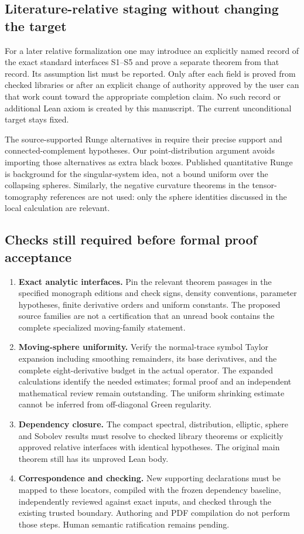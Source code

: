 \documentclass[11pt]{article}
\theoremstyle{definition}
\theoremstyle{remark}
\numberwithin{equation}{section}
\begin{document}
\subsection{Literature-relative staging without changing the target}
For a later relative formalization one may introduce an explicitly named
record of the exact standard interfaces S1--S5 and prove a separate theorem
from that record. Its assumption list must be reported. Only after each
field is proved from checked libraries or after an explicit change of
authority approved by the user can that work count toward the appropriate
completion claim. No such record or additional Lean axiom is created by
this manuscript. The current unconditional target stays fixed.

The source-supported Runge alternatives in \cite{LLS20} require their
precise support and connected-complement hypotheses. Our point-distribution
argument avoids importing those alternatives as extra black boxes.
Published quantitative Runge is background for the singular-system idea,
not a bound uniform over the collapsing spheres. Similarly, the negative
curvature theorems in the tensor-tomography references are not used:
only the sphere identities discussed in the local calculation are relevant.

\subsection{Checks still required before formal proof acceptance}
\begin{enumerate}
\item \textbf{Exact analytic interfaces.} Pin the relevant theorem passages
in the specified monograph editions and check signs, density conventions,
parameter hypotheses, finite derivative orders and uniform constants.
The proposed source families are not a certification that an unread book
contains the complete specialized moving-family statement.
\item \textbf{Moving-sphere uniformity.} Verify the normal-trace symbol
Taylor expansion including smoothing remainders, its base derivatives,
and the complete eight-derivative budget in the actual operator. The
expanded calculations identify the needed estimates; formal proof and
an independent mathematical review remain outstanding. The uniform
shrinking estimate cannot be inferred from off-diagonal Green regularity.
\item \textbf{Dependency closure.} The compact spectral, distribution,
elliptic, sphere and Sobolev results must resolve to checked library
theorems or explicitly approved relative interfaces with identical
hypotheses. The original main theorem still has its unproved Lean body.
\item \textbf{Correspondence and checking.} New supporting declarations
must be mapped to these locators, compiled with the frozen dependency
baseline, independently reviewed against exact inputs, and checked
through the existing trusted boundary. Authoring and PDF compilation
do not perform those steps. Human semantic ratification remains pending.
\end{enumerate}
\end{document}
